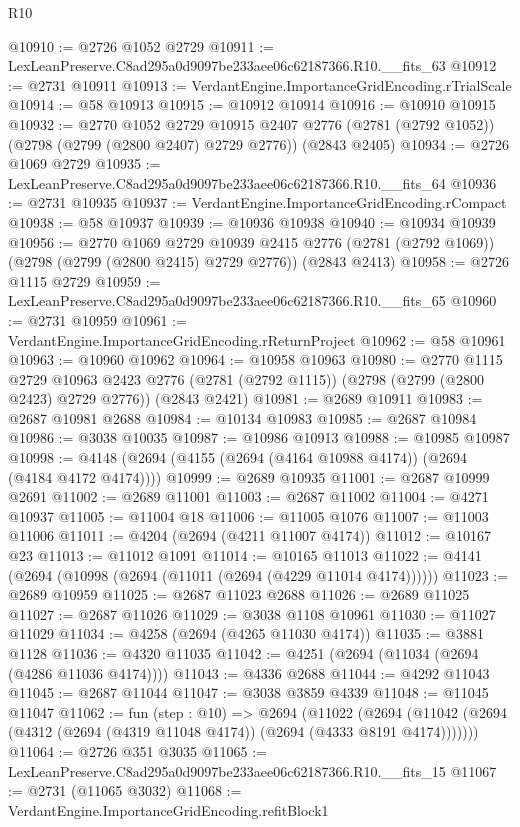 \begin{lexlean}{R10}
\begin{coremodule}
@10910 := @2726 @1052 @2729
@10911 := LexLeanPreserve.C8ad295a0d9097be233aee06c62187366.R10.__fits_63
@10912 := @2731 @10911
@10913 := VerdantEngine.ImportanceGridEncoding.rTrialScale
@10914 := @58 @10913
@10915 := @10912 @10914
@10916 := @10910 @10915
@10932 := @2770
    @1052
    @2729
    @10915
    @2407
    @2776
    (@2781 (@2792 @1052))
    (@2798 (@2799 (@2800 @2407) @2729 @2776))
    (@2843 @2405)
@10934 := @2726 @1069 @2729
@10935 := LexLeanPreserve.C8ad295a0d9097be233aee06c62187366.R10.__fits_64
@10936 := @2731 @10935
@10937 := VerdantEngine.ImportanceGridEncoding.rCompact
@10938 := @58 @10937
@10939 := @10936 @10938
@10940 := @10934 @10939
@10956 := @2770
    @1069
    @2729
    @10939
    @2415
    @2776
    (@2781 (@2792 @1069))
    (@2798 (@2799 (@2800 @2415) @2729 @2776))
    (@2843 @2413)
@10958 := @2726 @1115 @2729
@10959 := LexLeanPreserve.C8ad295a0d9097be233aee06c62187366.R10.__fits_65
@10960 := @2731 @10959
@10961 := VerdantEngine.ImportanceGridEncoding.rReturnProject
@10962 := @58 @10961
@10963 := @10960 @10962
@10964 := @10958 @10963
@10980 := @2770
    @1115
    @2729
    @10963
    @2423
    @2776
    (@2781 (@2792 @1115))
    (@2798 (@2799 (@2800 @2423) @2729 @2776))
    (@2843 @2421)
@10981 := @2689 @10911
@10983 := @2687 @10981 @2688
@10984 := @10134 @10983
@10985 := @2687 @10984
@10986 := @3038 @10035
@10987 := @10986 @10913
@10988 := @10985 @10987
@10998 := @4148 (@2694 (@4155 (@2694 (@4164 @10988 @4174)) (@2694 (@4184 @4172 @4174))))
@10999 := @2689 @10935
@11001 := @2687 @10999 @2691
@11002 := @2689 @11001
@11003 := @2687 @11002
@11004 := @4271 @10937
@11005 := @11004 @18
@11006 := @11005 @1076
@11007 := @11003 @11006
@11011 := @4204 (@2694 (@4211 @11007 @4174))
@11012 := @10167 @23
@11013 := @11012 @1091
@11014 := @10165 @11013
@11022 := @4141 (@2694 (@10998 (@2694 (@11011 (@2694 (@4229 @11014 @4174))))))
@11023 := @2689 @10959
@11025 := @2687 @11023 @2688
@11026 := @2689 @11025
@11027 := @2687 @11026
@11029 := @3038 @1108 @10961
@11030 := @11027 @11029
@11034 := @4258 (@2694 (@4265 @11030 @4174))
@11035 := @3881 @1128
@11036 := @4320 @11035
@11042 := @4251 (@2694 (@11034 (@2694 (@4286 @11036 @4174))))
@11043 := @4336 @2688
@11044 := @4292 @11043
@11045 := @2687 @11044
@11047 := @3038 @3859 @4339
@11048 := @11045 @11047
@11062 := fun (step : @10) =>
  @2694
    (@11022
      (@2694 (@11042 (@2694 (@4312 (@2694 (@4319 @11048 @4174)) (@2694 (@4333 @8191 @4174)))))))
@11064 := @2726 @351 @3035
@11065 := LexLeanPreserve.C8ad295a0d9097be233aee06c62187366.R10.__fits_15
@11067 := @2731 (@11065 @3032)
@11068 := VerdantEngine.ImportanceGridEncoding.refitBlock1

\end{coremodule}
\end{lexlean}
